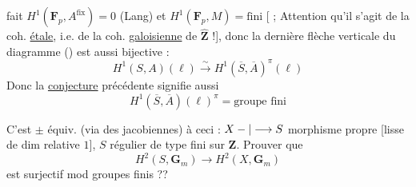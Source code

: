 fait $H^1(\mathbf{F}_p,A^{\mathrm{fix}})=0$ (Lang) et $H^1(\mathbf{F}_p,M)=\text{fini}$ [ ; Attention qu'il s'agit de la coh. \uline{étale}, i.e. de la coh. \uline{galoisienne} de $\widehat{\mathbf{Z}}$ !], donc la dernière flèche verticale du diagramme () est aussi bijective :
\[
H^1(S,A)(\ell)\xrightarrow{\sim}H^1(\overline{S},\overline{A})^\pi(\ell)
\]
Donc la \uline{conjecture} précédente signifie aussi
\[
\boxed{H^1(\overline{S},\overline{A})(\ell)^\pi=\text{groupe fini}}
\]

C'est  $\pm$ équiv. (via des jacobiennes) à ceci : $X-|\longrightarrow S$ morphisme propre [lisse de dim relative $1$], $S$ régulier de type fini sur $\mathbf{Z}$. Prouver que
\[
H^2(S,\mathbf{G}_m)\longrightarrow H^2(X,\mathbf{G}_m)
\]
est surjectif mod groupes finis ??

